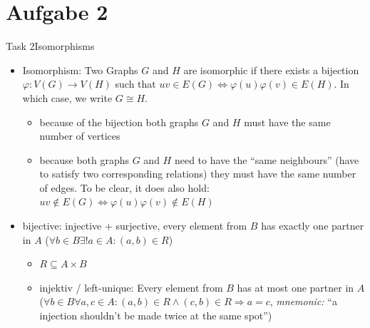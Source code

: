 
\section{Aufgabe 2}

\setcounter{task}{1}

\begin{frame}[allowframebreaks]{Task 2}{Isomorphisms}
  \begin{requirementsnoinc}
    \begin{itemize}
      \item \alert{Isomorphism:} Two Graphs $G$ and $H$ are \alert{isomorphic} if there exists a \alert{bijection} $\varphi: V(G) \to V(H)$ such that  $uv\in E(G) \Leftrightarrow \varphi(u)\varphi(v) \in E(H)$. In which case, we write $G\cong H$.
      \begin{itemize}
        \item because of the \alert{bijection} both graphs $G$ and $H$ must have the \alert{same number} of \alert{vertices}
        \item because both graphs $G$ and $H$ need to have the \alert{\enquote{same neighbours}} (have to satisfy two corresponding relations) they must have the \alert{same number} of \alert{edges}. To be clear, it does also hold: $uv\not\in E(G) \Leftrightarrow \varphi(u)\varphi(v)\not\in E(H)$
      \end{itemize} 
\end{itemize}
  \end{requirementsnoinc}
  \begin{requirementsnoinc}
    \begin{itemize}
      \item \alert{bijective:} injective + surjective, every element from $B$ has \alert{exactly} one partner in $A$ ($\forall b \in B \exists ! a \in A:(a, b) \in R$)
      \begin{itemize}
        \item $R\subseteq A\times B$
        \item \alert{injektiv / left-unique:} Every element from $B$ has \alert{at most} one partner in $A$ ($\forall b \in B \forall a, c \in A:(a, b) \in R \wedge(c, b) \in R \Rightarrow a=c$, \textit{mnemonic:} \enquote{a injection shouldn't be made twice at the same spot})

\end{itemize}
\end{itemize}
\end{requirementsnoinc}
\end{frame}
